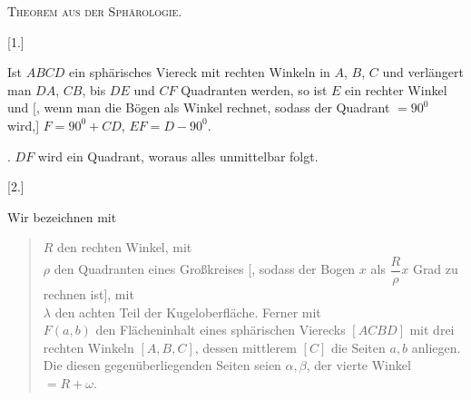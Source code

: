 \clearpage
{}%
\begin{center}
{\Large\textsc{Theorem aus der Sph\"arologie.}}
\end{center}

\begin{center}\begin{minipage}{\linewidth}\centering\end{minipage}\end{center}

[1.]

Ist $ABCD$ ein sphärisches Viereck mit rechten Winkeln in $A$, $B$, $C$ und verlängert man $DA$, $CB$, bis $DE$ und $CF$ Quadranten werden, so ist $E$ ein rechter Winkel und [, wenn man die Bögen als Winkel rechnet, sodass der Quadrant $= 90^{0}$ wird,] $F = 90^{0} + CD$, $EF = D - 90^{0}$.

. $DF$ wird ein Quadrant, woraus alles unmittelbar folgt.

[2.]

Wir bezeichnen mit

\begin{quote}
$R$ den rechten Winkel, mit\\
$\rho$ den Quadranten eines Großkreises [, sodass der Bogen $x$ als $\dfrac{R}{\rho}x$ Grad zu rechnen ist], mit\\
$\lambda$ den achten Teil der Kugeloberfläche. Ferner mit\\
$F(a,b)$ den Flächeninhalt eines sphärischen Vierecks $[ACBD]$ mit drei rechten Winkeln $[A, B, C]$, dessen mittlerem $[C]$ die Seiten $a, b$ anliegen. Die diesen gegenüberliegenden Seiten seien $\alpha, \beta$, der vierte Winkel $= R + \omega$.
\end{quote}
